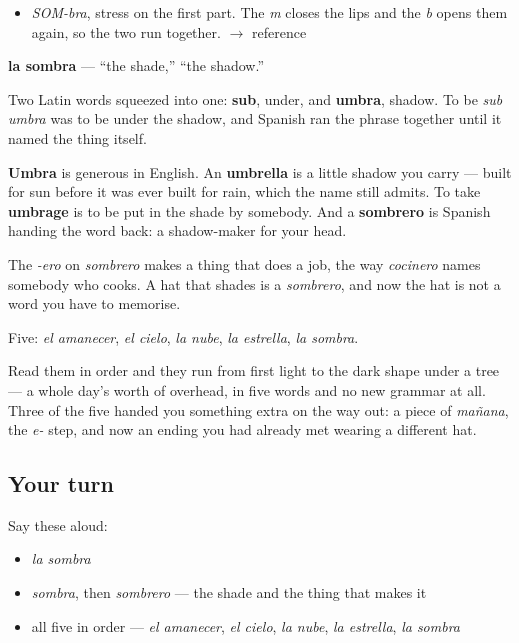 \begin{sounds}
\begin{itemize}
\raggedright
  \item \emph{SOM-bra}, stress on the first part. The \emph{m} closes the lips and the \emph{b} opens them again, so the two run together. $\to$ reference
\end{itemize}
\end{sounds}

\begin{cousinweb}
\textbf{la sombra} — \textquotedblleft{}the shade,\textquotedblright{} \textquotedblleft{}the shadow.\textquotedblright{}

Two Latin words squeezed into one: \textbf{sub}, under, and \textbf{umbra}, shadow. To be \emph{sub umbra} was to be under the shadow, and Spanish ran the phrase together until it named the thing itself.

\textbf{Umbra} is generous in English. An \textbf{umbrella} is a little shadow you carry — built for sun before it was ever built for rain, which the name still admits. To take \textbf{umbrage} is to be put in the shade by somebody. And a \textbf{sombrero} is Spanish handing the word back: a shadow-maker for your head.

The \emph{-ero} on \emph{sombrero} makes a thing that does a job, the way \emph{cocinero} names somebody who cooks. A hat that shades is a \emph{sombrero}, and now the hat is not a word you have to memorise.
\end{cousinweb}

\begin{grammarlens}[title={What you've built}]
Five: \emph{el amanecer}, \emph{el cielo}, \emph{la nube}, \emph{la estrella}, \emph{la sombra}.

Read them in order and they run from first light to the dark shape under a tree — a whole day's worth of overhead, in five words and no new grammar at all. Three of the five handed you something extra on the way out: a piece of \emph{mañana}, the \emph{e-} step, and now an ending you had already met wearing a different hat.
\end{grammarlens}

\subsection*{Your turn}
Say these aloud:

\begin{itemize}
\raggedright
  \item \emph{la sombra}
  \item \emph{sombra}, then \emph{sombrero} — the shade and the thing that makes it
  \item all five in order — \emph{el amanecer}, \emph{el cielo}, \emph{la nube}, \emph{la estrella}, \emph{la sombra}
\end{itemize}

